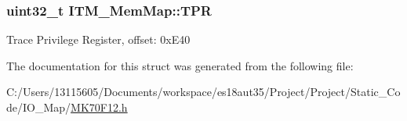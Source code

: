 \subsubsection[{T\+P\+R}]{\setlength{\rightskip}{0pt plus 5cm}uint32\+\_\+t I\+T\+M\+\_\+\+Mem\+Map\+::\+T\+P\+R}\label{struct_i_t_m___mem_map_a24ac79f5d070330282c6c0feae3cbcc1}
Trace Privilege Register, offset\+: 0x\+E40 

The documentation for this struct was generated from the following file\+:\begin{DoxyCompactItemize}
\item 
C\+:/\+Users/13115605/\+Documents/workspace/es18aut35/\+Project/\+Project/\+Static\+\_\+\+Code/\+I\+O\+\_\+\+Map/\hyperlink{_m_k70_f12_8h}{M\+K70\+F12.\+h}\end{DoxyCompactItemize}
